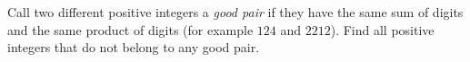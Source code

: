 Call two different positive integers a \emph{good pair} if they have the same sum of digits and the same product of digits (for example $124$ and $2212$). Find all positive integers that do not belong to any good pair.
